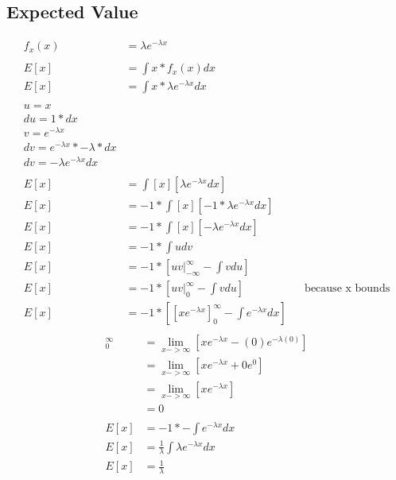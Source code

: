 \documentclass[]{article}
\begin{document}
\subsection{Expected Value}
\begin{align*}
f_x(x) &= \lambda e^{-\lambda x}\\
\\
E[x] &= \int {x*f_x(x)dx}\\
E[x] &= \int {x*\lambda e^{-\lambda x}dx}\\
\\
	u = x\\
	du = 1*dx\\
	v = e^{-\lambda x}\\
	dv = e^{-\lambda x}*-\lambda * dx\\
	dv = -\lambda e^{-\lambda x}dx\\
	\\
E[x] &= \int {[x] [\lambda e^{-\lambda x}dx]}\\
E[x] &= -1*\int {[x] [-1* \lambda e^{-\lambda x}dx]}\\
E[x] &= -1*\int {[x] [-\lambda e^{-\lambda x}dx]}\\
E[x] &= -1*\int {udv}\\
E[x] &= -1*[uv|_{-\infty}^{\infty} - \int {vdu}]\\
E[x] &= -1*[uv|_{0}^{\infty} - \int {vdu}] && \text{because x bounds}\\
E[x] &= -1*[[xe^{-\lambda x}]_{0}^{\infty} - \int {e^{-\lambda x}dx}]\\
\end{align*}
\begin{align*}
[xe^{-\lambda x}]_{0}^{\infty} &= \lim_{x->\infty}{[xe^{-\lambda x} - (0)e^{-\lambda (0)}]}\\
&= \lim_{x->\infty}{[xe^{-\lambda x} + 0e^{0}]}\\
&= \lim_{x->\infty}{[xe^{-\lambda x}]}\\
&= 0\\
\\
E[x] &= -1 * - \int {e^{-\lambda x}dx}\\
E[x] &= \frac{1}{\lambda} \int {\lambda e^{-\lambda x}dx}\\
E[x] &= \frac{1}{\lambda}\\
\end{align*}
\end{document}
